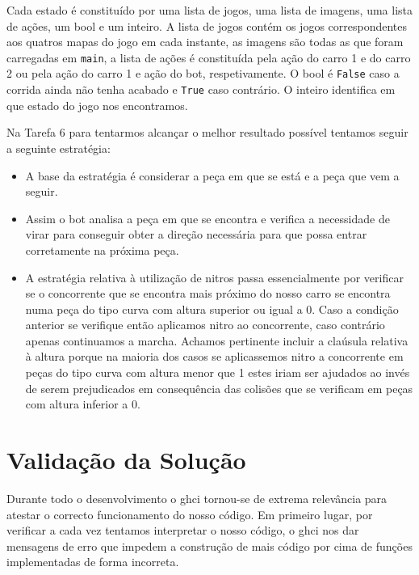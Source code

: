 \documentclass[a4paper]{report}
\begin{document}
Cada estado é constituído por uma lista de jogos, uma lista de imagens, uma
lista de ações, um bool e um inteiro. A lista de jogos contém os jogos
correspondentes aos quatros mapas do jogo em cada instante, as imagens são todas
as que foram carregadas em \texttt{main}, a lista de ações é constituída pela ação do
carro 1 e do carro 2 ou pela ação do carro 1 e ação do bot,
respetivamente. O bool é \texttt{False} caso a corrida ainda não tenha acabado e
\texttt{True} caso contrário. O inteiro identifica em que estado do jogo nos
encontramos.


Na Tarefa 6 para tentarmos alcançar o melhor resultado possível tentamos seguir
a seguinte estratégia:

\begin{itemize}
\item
  A base da estratégia é considerar a peça em que se está e a peça que
  vem a seguir.
\item
  Assim o bot analisa a peça em que se encontra e verifica a necessidade
  de virar para conseguir obter a direção necessária para que possa
  entrar corretamente na próxima peça.
\item
  A estratégia relativa à utilização de nitros passa essencialmente por
  verificar se o concorrente que se encontra mais próximo do nosso carro
  se encontra numa peça do tipo curva com altura superior ou igual a 0.
  Caso a condição anterior se verifique então aplicamos nitro ao
  concorrente, caso contrário apenas continuamos a marcha. Achamos
  pertinente incluir a claúsula relativa à altura porque na maioria dos
  casos se aplicassemos nitro a concorrente em peças do tipo curva com
  altura menor que 1 estes iriam ser ajudados ao invés de serem
  prejudicados em consequência das colisões que se verificam em peças
  com altura inferior a 0.
\end{itemize}



\chapter{Validação da Solução}

Durante todo o desenvolvimento o ghci tornou-se de extrema relevância para
atestar o correcto funcionamento do nosso código. Em primeiro lugar, por
verificar a cada vez tentamos interpretar o nosso código, o ghci nos dar
mensagens de erro que impedem a construção de mais código por cima de funções
implementadas de forma incorreta.
\end{document}
